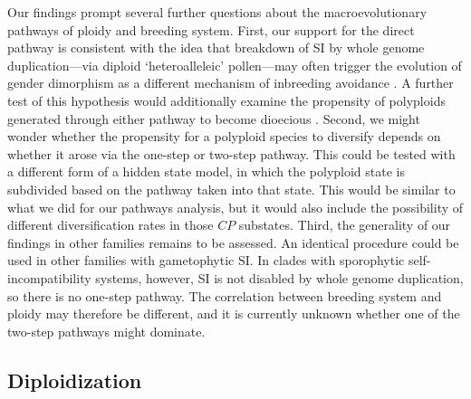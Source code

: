 Our findings prompt several further questions about the macroevolutionary pathways of ploidy and breeding system.
%
First, our support for the direct pathway is consistent with the idea that breakdown of SI by whole genome duplication---via diploid `heteroalleleic' pollen---may often trigger the evolution of gender dimorphism as a different mechanism of inbreeding avoidance \citep{miller_2000}.
A further test of this hypothesis would additionally examine the propensity of polyploids generated through either pathway to become dioecious \citep{robertson_2011}.
%
Second, we might wonder whether the propensity for a polyploid species to diversify depends on whether it arose via the one-step or two-step pathway.
This could be tested with a different form of a hidden state model, in which the polyploid state is subdivided based on the pathway taken into that state.
This would be similar to what we did for our pathways analysis, but it would also include the possibility of different diversification rates in those $CP$ substates.
%
Third, the generality of our findings in other families remains to be assessed.
An identical procedure could be used in other families with gametophytic SI.
In clades with sporophytic self-incompatibility systems, however, SI is not disabled by whole genome duplication, so there is no one-step pathway. %
The correlation between breeding system and ploidy may therefore be different, and it is currently unknown whether one of the two-step pathways might dominate.


\subsection*{Diploidization}


